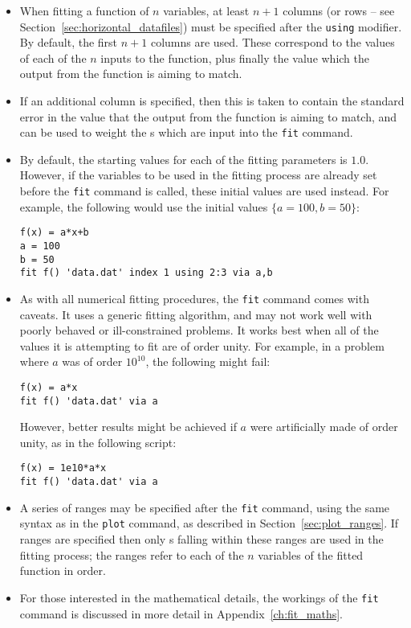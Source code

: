 \begin{itemize}
\item When fitting a function of $n$ variables, at least $n+1$ columns (or
rows -- see Section~\ref{sec:horizontal_datafiles}) must be specified after the
{\tt using} modifier. By default, the first $n+1$ columns are used. These
correspond to the values of each of the $n$ inputs to the function, plus
finally the value which the output from the function is aiming to match.
\item If an additional column is specified, then this is taken to contain the
standard error in the value that the output from the function is aiming to
match, and can be used to weight the \datapoint s which are input into the
{\tt fit} command.
\item By default, the starting values for each of the fitting parameters is
$1.0$. However, if the variables to be used in the fitting process are already
set before the {\tt fit} command is called, these initial values are used
instead. For example, the following would use the initial values
$\{a=100,b=50\}$:
\begin{verbatim}
f(x) = a*x+b
a = 100
b = 50
fit f() 'data.dat' index 1 using 2:3 via a,b
\end{verbatim}

\item As with all numerical fitting procedures, the {\tt fit} command comes
with caveats. It uses a generic fitting algorithm, and may not work well with
poorly behaved or ill-constrained problems. It works best when all of the
values it is attempting to fit are of order unity. For example, in a problem
where $a$ was of order $10^{10}$, the following might fail:
\begin{verbatim}
f(x) = a*x
fit f() 'data.dat' via a
\end{verbatim}
However, better results might be achieved if $a$ were artificially made of
order unity, as in the following script:
\begin{verbatim}
f(x) = 1e10*a*x
fit f() 'data.dat' via a
\end{verbatim}

\item A series of ranges may be specified after the {\tt fit} command, using
the same syntax as in the {\tt plot} command, as described in
Section~\ref{sec:plot_ranges}. If ranges are specified then only \datapoint s
falling within these ranges are used in the fitting process; the ranges refer
to each of the $n$ variables of the fitted function in order.

\item For those interested in the mathematical details, the workings of the
{\tt fit} command is discussed in more detail in Appendix~\ref{ch:fit_maths}.

\end{itemize}

